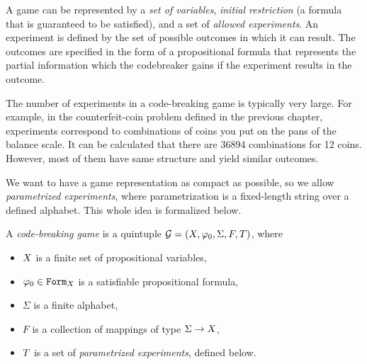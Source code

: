 A game can be represented by a \emph{set of variables},
  \emph{initial restriction} (a formula that is guaranteed to be satisfied),
  and a set of \emph{allowed experiments}.
An experiment is defined by the set of possible outcomes in which it can result.
The outcomes are specified in the form of a propositional formula that
  represents the partial information
  which the codebreaker gains if the experiment results in the outcome.

The number of experiments in a code-breaking game is typically very large.
For example, in the counterfeit-coin problem defined in the previous chapter,
  experiments correspond to combinations of coins you put on the pans of the
  balance scale.
It can be calculated that there are 36894 combinations for 12 coins.
However, most of them have same structure and yield similar outcomes.

We want to have a game representation as compact as possible,
  so we allow \emph{parametrized experiments},
  where parametrization is a fixed-length string over a defined alphabet.
This whole idea is formalized below.

\pagebreak
\begin{definition} \label{def:game}
A \emph{code-breaking game} is a quintuple
  $\mathcal{G} = (X, \varphi_0, \Sigma, F, T)$, where
  \begin{itemize}
  \item $X$ is a finite set of propositional variables,
  \item $\varphi_0 \in \mathtt{Form}_X$ is a satisfiable propositional formula,
  \item $\Sigma$ is a finite alphabet,
  \item $F$ is a collection of mappings of type $\Sigma -> X$,
  \item $T$ is a set of \emph{parametrized experiments}, defined below.
  \end{itemize}
\end{definition}

